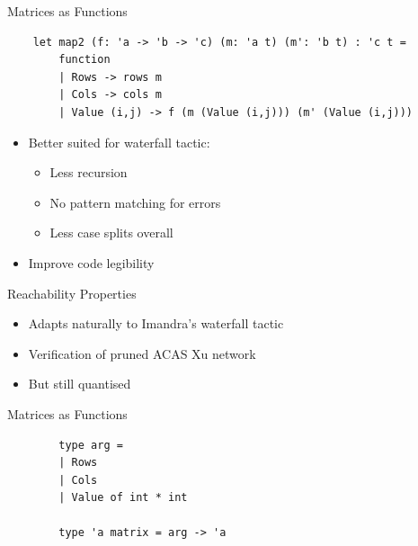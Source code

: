 \documentclass{beamer}
\begin{document}
	
\begin{frame}[fragile]{Matrices as Functions}
	\begin{lstlisting}
	let map2 (f: 'a -> 'b -> 'c) (m: 'a t) (m': 'b t) : 'c t =
		function
		| Rows -> rows m
		| Cols -> cols m
		| Value (i,j) -> f (m (Value (i,j))) (m' (Value (i,j)))	
	\end{lstlisting}
	\begin{itemize}
	\item<2-> Better suited for waterfall tactic:
	\begin{itemize}
		\item<3-> Less recursion
		\item<4-> No pattern matching for errors
		\item<5-> Less case splits overall
	\end{itemize}
	\item<6-> Improve code legibility
\end{itemize}
\end{frame}


\begin{frame}{Reachability Properties}
		\begin{itemize}
			\item<1-> Adapts naturally to Imandra's waterfall tactic
			\item<1-> Verification of pruned ACAS Xu network
			\item<2-> But still quantised
		\end{itemize}
\end{frame}


\begin{frame}[fragile]{Matrices as Functions}
	\begin{lstlisting}
		type arg =
		| Rows
		| Cols
		| Value of int * int
		
		type 'a matrix = arg -> 'a
	\end{lstlisting}

\end{frame}
\end{document}
